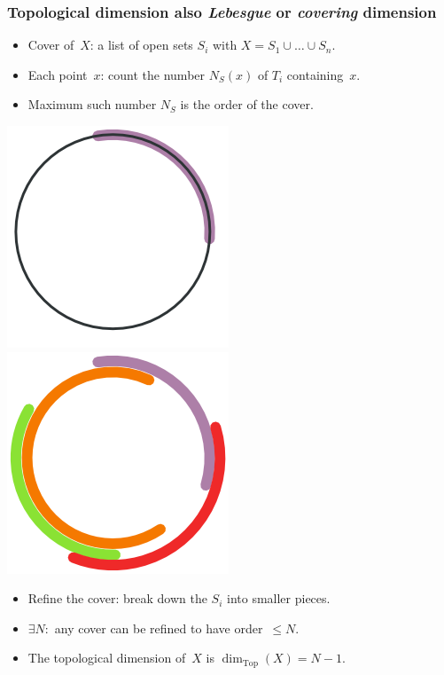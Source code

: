 \documentclass[12pt]{beamer}
\newcommand\dimT{\operatorname{dim}_{\operatorname{Top}}}
\begin{document}
\begin{frame}
\frametitle{Topological dimension \footnotesize\hfill also \emph{Lebesgue} or \emph{covering} dimension}
\begin{itemize}[<+->]
	\item \alert{Cover} of~$X$: a list of open sets $S_i$ with $X = S_1 \cup \dots \cup S_n$.
	\item Each point~$x$: count the number $N_S(x)$ of $T_i$ containing~$x$.
	\item Maximum such number $N_S$ is the \alert{order} of the cover.	
\end{itemize}

\begin{center}
\includegraphics[width=0.25\linewidth]{../media/processed/covering_dimension1}
\quad
\includegraphics[width=0.25\linewidth]{../media/processed/covering_dimension2}
\quad
{}
\end{center}

\begin{itemize}[<+->]
	\item \alert{Refine} the cover: break down the $S_i$ into smaller pieces.
	\item $\exists N:$ any cover can be refined to have order~$\leq N$.
	\item The \alert{topological dimension} of~$X$ is $\dimT(X) = N-1$.
\end{itemize}
\end{frame}
\end{document}
